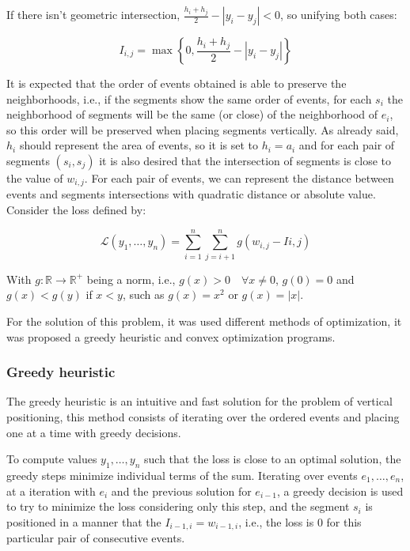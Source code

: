If there isn't geometric intersection, $\frac{h_i + h_j}{2} - |y_i - y_j| < 0$, so unifying both cases:

\begin{equation}
I_{i, j} = \max\left\{0, \frac{h_i + h_j}{2} - |y_i - y_j|\right\}    
\end{equation}

It is expected that the order of events obtained is able to preserve the neighborhoods, i.e., 
%
if the segments show the same order of events, for each $s_i$ the neighborhood of segments will be the same (or close) of the neighborhood of $e_i$, so this order will be preserved when placing segments vertically. 
%
As already said, $h_i$ should represent the area of events, so it is set to $h_i = a_i$ and for each pair of segments $(s_i, s_j)$ it is also desired that the intersection of segments is close to the value of $w_{i, j}$. 
%
For each pair of events, we can represent the distance between events and segments intersections with quadratic distance or absolute value.
%
Consider the loss defined by:

\begin{equation}
    \mathcal{L}(y_1, \dots, y_n) = \sum_{i = 1}^n \sum_{j = i+1}^n g(w_{i, j} - I{i,j})
    \label{loss_intersection_quadratic}
\end{equation}
%

With $g: \mathbb{R} \to \mathbb{R}^+$ being a norm,  i.e., $g(x) > 0 \quad \forall x \neq 0$, $g(0) = 0$ and $g(x) < g(y)$ if $x < y$, such as $g(x) = x^2$ or $g(x) = |x|$.

For the solution of this problem, it was used different methods of optimization, it was proposed a greedy heuristic and convex optimization programs.

\subsubsection{Greedy heuristic}

The greedy heuristic is an intuitive and fast solution for the problem of vertical positioning, this method consists of iterating over the ordered events and placing one at a time with greedy decisions.
%

To compute values $y_1, \dots, y_n$ such that the loss is close to an optimal solution, the greedy steps minimize individual terms of the sum. 
%
Iterating over events $e_1, \dots, e_n$, at a iteration with $e_{i}$ and the previous solution for $e_{i-1}$,  a greedy decision is used to try to minimize the loss considering only this step, and the segment $s_i$ is positioned in a manner that the $I_{i-1,i} = w_{i-1, i}$, i.e., the loss is $0$ for this particular pair of consecutive events.

